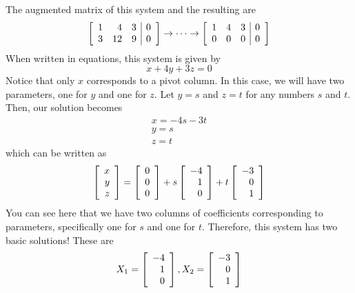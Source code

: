 \begin{solution}
The augmented matrix of this system and the resulting \rref \;are 
\begin{equation*}
\left[
\begin{array}{rrr|r}
1 & 4 & 3 & 0 \\
3 & 12 & 9 & 0
\end{array}
\right]
\rightarrow \cdots \rightarrow
\left[
\begin{array}{rrr|r}
1 & 4 & 3 & 0 \\
0 & 0 & 0 & 0
\end{array}
\right]
\end{equation*}
When written in equations, this system is given by 
\begin{equation*}
x + 4y +3z=0
\end{equation*}
Notice that only $x$ corresponds to a pivot column. In this case, we will have two parameters, 
one for $y$ and one for $z$. Let $y = s$ and $z=t$ for any numbers $s$ and $t$. Then, our solution becomes
\begin{equation*}
\begin{array}{c}
x = -4s - 3t \\
y = s \\
z = t
\end{array}
\end{equation*}
which can be written as 
\begin{equation*}
\left[
\begin{array}{r}
x\\
y\\
z
\end{array}
\right]
=
\left[
\begin{array}{r}
0\\
0\\
0
\end{array}
\right]
+
s
\left[
\begin{array}{r}
-4 \\
1 \\
0
\end{array}
\right]
+ 
t
\left[
\begin{array}{r}
-3 \\
0 \\
1
\end{array}
\right]
\end{equation*}
You can see here that we have two columns of coefficients corresponding to parameters, specifically one for $s$ and one for $t$. 
Therefore, this system has two basic solutions! These are
\begin{equation*}
X_1=
\left[
\begin{array}{r}
-4 \\
1 \\
0
\end{array}
\right], X_2 = \left[
\begin{array}{r}
-3 \\
0 \\
1
\end{array}
\right]
\end{equation*} 
\end{solution}

